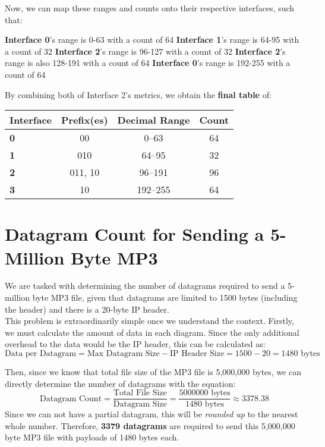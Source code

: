 \documentclass[colorlinks=true, allcolors=blue]{article}
\begin{document}
Now, we can map these ranges and counts onto their respective interfaces, such that:
\begin{center}
    \textbf{Interface 0}'s range is 0-63 with a count of 64
    \textbf{Interface 1}'s range is 64-95 with a count of 32
    \textbf{Interface 2}'s range is 96-127 with a count of 32
    \textbf{Interface 2}'s range is also 128-191 with a count of 64
    \textbf{Interface 0}'s range is 192-255 with a count of 64
\end{center}

By combining both of Interface 2's metrics, we obtain the \textbf{final table} of:


\begin{table}[ht]
  \centering
  \renewcommand{\arraystretch}{1.2}
  \begin{tabular}{|P|c|c|c|}
    \hline
    \textbf{Interface} & \textbf{Prefix(es)} & \textbf{Decimal Range} & \textbf{Count} \\
    \hline
    \textbf{0}   & 00 & 0--63     & 64 \\
    \hline
    \textbf{1}  & 010 & 64--95    & 32 \\
    \hline
    \textbf{2}  & 011, 10 & 96--191   & 96 \\
    \hline
    \textbf{3}   & 10 & 192--255  & 64 \\
    \hline
  \end{tabular}
\end{table}

\setcounter{section}{16}
\section{Datagram Count for Sending a 5-Million Byte MP3}
We are tasked with determining the number of datagrams required to send a 5-million byte MP3 file, given that datagrams are limited to 1500 bytes (including the header) and there is a 20-byte IP header. \\

This problem is extraordinarily simple once we understand the context. Firstly, we must calculate the amount of data in each diagram. Since the only additional overhead to the data would be the IP header, this can be calculated as:
\[
\text{Data per Datagram} = \text{Max Datagram Size} - \text{IP Header Size} = 1500 - 20 = 1480 \text{ bytes}
\]

Then, since we know that total file size of the MP3 file is 5,000,000 bytes, we can directly determine the number of datagrams with the equation:
\[
\text{Datagram Count} = \frac{\text{Total File Size}}{\text{Datagram Size}} = \frac{5000000 \text{ bytes}}{1480 \text{ bytes}} \approx 3378.38
\]
Since we can not have a partial datagram, this will be \textit{rounded up} to the nearest whole number. Therefore, \textbf{3379 datagrams} are required to send this 5,000,000 byte MP3 file with payloads of 1480 bytes each.


\clearpage  %
\end{document}
